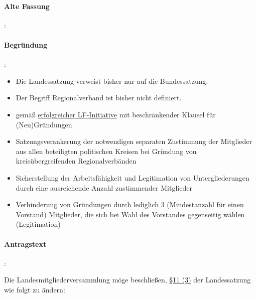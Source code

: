 \paragraph{Alte Fassung}:


\paragraph{Begründung}:

\begin{itemize}
\item Die Landessatzung verweist bisher nur auf die Bundessatzung.
\item Der Begriff Regionalverband ist bisher nicht definiert.
\item gemäß \href{http://lqfb.piraten-lsa.de/lsa/initiative/show/33.html}{erfolgreicher LF-Initiative} mit beschränkender Klausel für (Neu)Gründungen
\item Satzungsverankerung der notwendigen separaten Zustimmung der Mitglieder aus allen beteiligten politischen Kreisen bei Gründung von kreisübergreifenden Regionalverbänden
\item Sicherstellung der Arbeitsfähigkeit und Legitimation von Untergliederungen durch eine ausreichende Anzahl zustimmender Mitglieder
\item Verhinderung von Gründungen durch lediglich 3 (Mindestanzahl für einen Vorstand) Mitglieder, die sich bei Wahl des Vorstandes gegenseitig wählen (Legitimation) 
\end{itemize}



\paragraph{Antragstext}:

Die Landesmitgliederversammlung möge beschließen, \href{http://wiki.piratenpartei.de/LSA:Satzung#.C2.A7_11_-_Satzungs-_und_Programm.C3.A4nderung}{§11 (3)} der Landessatzung wie folgt zu ändern:


